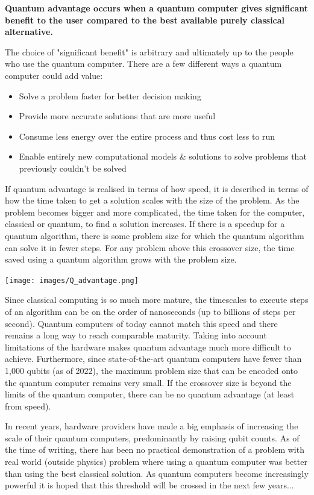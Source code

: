 \documentclass{book}
\begin{document}
\textbf{Quantum advantage occurs when a quantum computer gives significant benefit to the user compared to the best available purely classical alternative.} 

The choice of "significant benefit" is arbitrary and ultimately up to the people who use the quantum computer. There are a few different ways a quantum computer could add value: 

\begin{itemize}
    \item Solve a problem faster for better decision making
    \item Provide more accurate solutions that are more useful 
    \item Consume less energy over the entire process and thus cost less to run 
    \item Enable entirely new computational models \& solutions to solve problems that previously couldn't be solved
\end{itemize}

    
If quantum advantage is realised in terms of how speed, it is described in terms of how the time taken to get a solution scales with the size of the problem. As the problem becomes bigger and more complicated, the time taken for the computer, classical or quantum, to find a solution increases. If there is a speedup for a quantum algorithm, there is some problem size for which the quantum algorithm can solve it in fewer steps. For any problem above this crossover size, the time saved using a quantum algorithm grows with the problem size. 

\texttt{[image: images/Q\_advantage.png]}

Since classical computing is so much more mature, the timescales to execute steps of an algorithm can be on the order of nanoseconds (up to billions of steps per second). Quantum computers of today cannot match this speed and there remains a long way to reach comparable maturity. Taking into account limitations of the hardware makes quantum advantage much more difficult to achieve. Furthermore, since state-of-the-art quantum computers have fewer than 1,000 qubits (as of 2022), the maximum problem size that can be encoded onto the quantum computer remains very small. If the crossover size is beyond the limits of the quantum computer, there can be no quantum advantage (at least from speed). 

In recent years, hardware providers have made a big emphasis of increasing the scale of their quantum computers, predominantly by raising qubit counts. As of the time of writing, there has been no practical demonstration of a problem with real world (outside physics) problem where using a quantum computer was better than using the best classical solution. As quantum computers become increasingly powerful it is hoped that this threshold will be crossed in the next few years...
\end{document}
